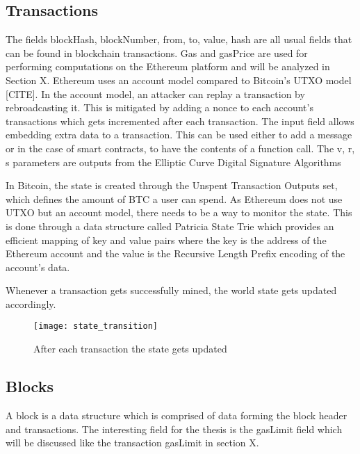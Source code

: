 \subsection{Transactions}

The fields blockHash, blockNumber, from, to, value, hash are all usual fields that can be found in blockchain transactions. Gas and gasPrice are used for performing computations on the Ethereum platform and will be analyzed in Section X. Ethereum uses an account model compared to Bitcoin's UTXO model [CITE]. In the account model, an attacker can replay a transaction by rebroadcasting it. This is mitigated by adding a nonce to each account's transactions which gets incremented after each transaction. The input field allows embedding extra data to a transaction. This can be used either to add a message or in the case of smart contracts, to have the contents of a function call. The v, r, s parameters are outputs from the Elliptic Curve Digital Signature Algorithms %

In Bitcoin, the state is created through the Unspent Transaction Outputs set, which defines the amount of BTC  a user can spend. As Ethereum does not use UTXO but an account model, there needs to be a way to monitor the state. This is done through a data structure called Patricia State Trie \cite{Morrison:1968:PAR:321479.321481} which provides an efficient mapping of key and value pairs where the key is the address of the Ethereum account and the value is the Recursive Length Prefix encoding \cite{rlp} of the account's data. %

Whenever a transaction gets successfully mined, the world state gets updated accordingly.

\begin{figure}[ht]
    \centering
    \texttt{[image: state\_transition]}
    \caption{After each transaction the state gets updated}
    \label{blockchain}
\end{figure}
\subsection{Blocks}
A block is a data structure which is comprised of data forming the block header and transactions. The interesting field for the thesis is the gasLimit field which will be discussed like the transaction gasLimit in section X. 



